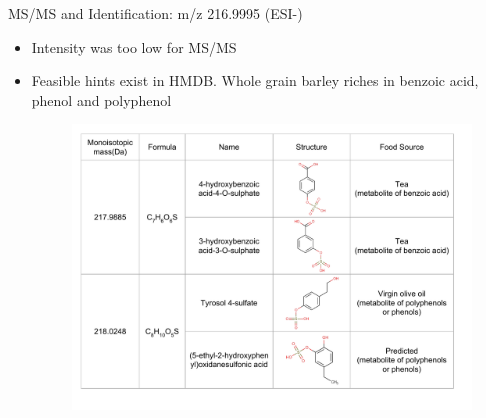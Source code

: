 \documentclass{beamer}
\begin{document}
\begin{frame}{MS/MS and Identification: m/z 216.9995 (ESI-)}

\begin{itemize}
\item Intensity was too low for MS/MS
\item Feasible hints exist in HMDB. Whole grain barley riches in benzoic acid, phenol and polyphenol
\begin{figure}[h!]
    \centering
    \includegraphics[scale=0.35]{images/216d9995.pdf}

    \label{fig:216p9995}
\end{figure}
\end{itemize}
\end{frame}
\end{document}
